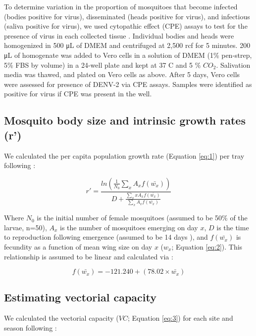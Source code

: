 \documentclass[12pt]{article}
\begin{document}
To determine variation in the proportion of mosquitoes that become infected (bodies positive for virus), disseminated (heads positive for virus), and infectious (saliva positive for virus), we used cytopathic effect (CPE) assays to test for the presence of virus in each collected tissue \citep{balaya1969}. Individual bodies and heads were homogenized in 500 \si{\micro\liter} of DMEM and centrifuged at 2,500 rcf for 5 minutes. 200 \si{\micro\liter} of homogenate was added to Vero cells in a solution of DMEM (1\% pen-strep, 5\% FBS by volume) in a 24-well plate and kept at 37 \degree C and 5 \% ${CO_2}$. Salivation media was thawed, and plated on Vero cells as above. After 5 days, Vero cells were assessed for presence of DENV-2 via CPE assays. Samples were identified as positive for virus if CPE was present in the well.

\subsection{Mosquito body size and intrinsic growth rates (r')}

We calculated the per capita population growth rate (Equation \ref{eq:1}) per tray following \citet{livdahl1984}:

\begin{equation} \label{eq:1}
r' = \frac{ln(\frac{1}{N_0}\sum_{x}^{ }{A_x}f(\bar{w_x}))}{D+\frac{\sum_{x}^{ }xA_xf(\bar{w_x})}{\sum_{x}^{ }A_xf(\bar{w_x})}}
\end{equation}

Where $N_0$ is the initial number of female mosquitoes (assumed to be 50\% of the larvae, n=50), $A_x$ is the number of mosquitoes emerging on day $x$, $D$ is the time to reproduction following emergence (assumed to be 14 days \citep{livdahl1991}), and $f(\bar{w_x})$ is fecundity as a function of mean wing size on day $x$ ($w_x$; Equation \ref{eq:2}). This relationship is assumed to be linear and calculated via \citet{lounibos2002}:

\begin{equation} \label{eq:2}
f(\bar{w_x}) = -121.240 + (78.02 \times \bar{w_x})
\end{equation}

\subsection{Estimating vectorial capacity}
We calculated the vectorial capacity ($VC$; Equation \ref{eq:3}) for each site and season following \citet{mordecai2017}:
\end{document}
